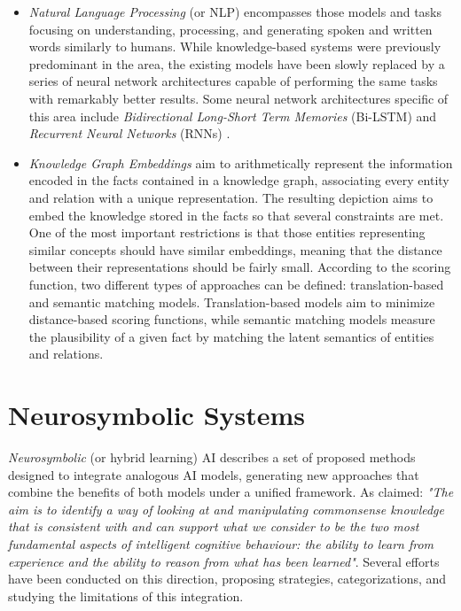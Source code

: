 \begin{itemize}
\begin{itemize}
        \item \textit{Natural Language Processing} (or NLP) \citep{chowdhury_2003_nlp} encompasses those models and tasks focusing on understanding, processing, and generating spoken and written words similarly to humans. While knowledge-based systems were previously predominant in the area, the existing models have been slowly replaced by a series of neural network architectures capable of performing the same tasks with remarkably better results. Some neural network architectures specific of this area include \textit{Bidirectional Long-Short Term Memories} (Bi-LSTM)\citep{devlin-etal-2019-bert,peters-etal-2018-deep} and \textit{Recurrent Neural Networks} (RNNs) \citep{wang-etal-2016-combination}. 
        
        \item \textit{Knowledge Graph Embeddings} \citep{dai_survey_2020} aim to arithmetically represent the information encoded in the facts contained in a knowledge graph, associating every entity and relation with a unique representation. The resulting depiction aims to embed the knowledge stored in the facts so that several constraints are met. One of the most important restrictions is that those entities representing similar concepts should have similar embeddings, meaning that the distance between their representations should be fairly small. According to the scoring function, two different types of approaches can be defined: translation-based and semantic matching models. Translation-based models aim to minimize distance-based scoring functions, while semantic matching models measure the plausibility of a given fact by matching the latent semantics of entities and relations.
    \end{itemize}

\end{itemize}


\section{Neurosymbolic Systems} \label{sec:sota_neurosymbolic_systems}
\textit{Neurosymbolic} (or hybrid learning) AI describes a set of proposed methods designed to integrate analogous AI models, generating new approaches that combine the benefits of both models under a unified framework. As \cite{valiant_three_2003} claimed: \textit{"The aim is to identify a way of looking at and manipulating commonsense knowledge that is consistent with and can support what we consider to be the two most fundamental aspects of intelligent cognitive behaviour: the ability to learn from experience and the ability to reason from what has been learned"}. Several efforts have been conducted on this direction, proposing strategies, categorizations, and studying the limitations of this integration. 

